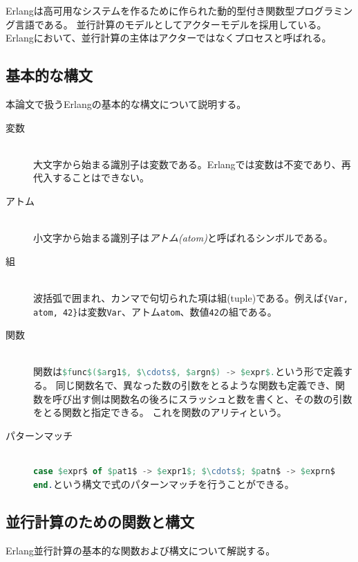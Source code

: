 Erlang\cite{erlang}は高可用なシステムを作るために作られた動的型付き関数型プログラミング言語である。
並行計算のモデルとしてアクターモデルを採用している。
Erlangにおいて、並行計算の主体はアクターではなくプロセスと呼ばれる。

\subsection{基本的な構文}

本論文で扱うErlangの基本的な構文について説明する。

\begin{description}
\item[変数]\mbox{}\\
  大文字から始まる識別子は変数である。Erlangでは変数は不変であり、再代入することはできない。
\item[アトム]\mbox{}\\
  小文字から始まる識別子は\emph{アトム(atom)}と呼ばれるシンボルである。
\item[組]\mbox{}\\
  波括弧で囲まれ、カンマで句切られた項は組(tuple)である。例えば\lstinline|{Var, atom, 42}|は変数\lstinline{Var}、アトム\lstinline{atom}、数値\lstinline{42}の組である。
\item[関数]\mbox{}\\
  関数は\lstinline[language=Erlang]{$func$($arg1$, $\cdots$, $argn$) -> $expr$.}という形で定義する。
  同じ関数名で、異なった数の引数をとるような関数も定義でき、関数を呼び出す側は関数名の後ろにスラッシュと数を書くと、その数の引数をとる関数と指定できる。
  これを関数のアリティという。
\item[パターンマッチ]\mbox{}\\
  \lstinline[language=Erlang]{case $expr$ of $pat1$ -> $expr1$; $\cdots$; $patn$ -> $exprn$ end.}という構文で式のパターンマッチを行うことができる。
\end{description}

\subsection{並行計算のための関数と構文}

Erlang並行計算の基本的な関数および構文について解説する。

